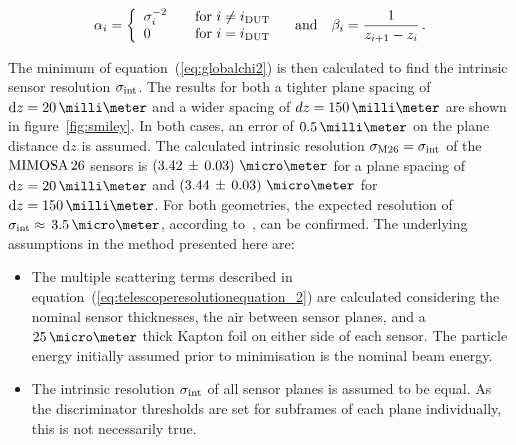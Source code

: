 \begin{equation}
\alpha_i = \left\{
  \begin{array}{l l}
    \sigma_{i}^{-2} & \quad \text{for $i \neq i_{\textrm{DUT}}$}\\
    0 & \quad \text{for $i = i_{\textrm{DUT}}$}
  \end{array} \right. \quad \text{and} \quad \beta_i = \frac{1}{z_{i + 1} - z_i} \,.
\end{equation}

The minimum of equation~(\ref{eq:globalchi2}) is then calculated to find the intrinsic sensor resolution $\sigma_{\textrm{int}}$.
The results for both a tighter plane spacing of $\dz = 20\,\milli\meter$ and a wider spacing of $dz = 150\,\milli\meter$ are shown in figure~\ref{fig:smiley}.
In both cases, an error of $0.5\,\milli\meter$ on the plane distance $\textrm{d}z$ is assumed.
The calculated intrinsic resolution $\sigma_{\textrm{M26}} = \sigma_{\textrm{int}}$ of the $\textrm{MIMOSA\,26}$ sensors is \allowbreak$\left( 3.42\,\pm\, \allowbreak 0.03 \right)\,\micro\meter$
 for a plane spacing of $\textrm{d}z =  20\,\milli\meter$ and $\left( 3.44\,\pm\, \allowbreak 0.03 \right)\,\micro\meter$ for $\textrm{d}z = 150\,\milli\meter$.
For both geometries, the expected resolution of $\sigmai \approx\,3.5\,\micro\meter$, according to~\cite{ref:mimosa26}, can be confirmed.
The underlying assumptions in the method presented here are:\\

\begin{itemize}

\item The multiple scattering terms described in equation~(\ref{eq:telescoperesolutionequation_2}) are calculated considering the nominal sensor thicknesses, the air between sensor planes, and a $25\,\micro\meter$
thick Kapton foil on either side of each sensor.
The particle energy initially assumed prior to minimisation is the nominal beam energy.

\item The intrinsic resolution $\sigma_{\textrm{int}}$ of all sensor planes is assumed to be equal.
As the discriminator thresholds are set for subframes of each plane individually, this is not necessarily true.

\end{itemize}


